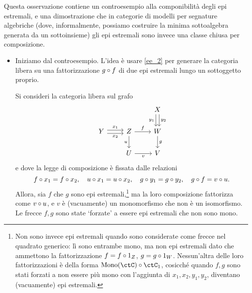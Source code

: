 \begin{remark}\label{compo_estremali}
	Questa osservazione contiene un controesempio alla componibilità degli epi estremali, e una dimostrazione che in categorie di modelli per segnature algebriche (dove, informalmente, possiamo costruire la minima sottoalgebra generata da un sottoinsieme) gli epi estremali sono invece una classe chiusa per composizione.
	\begin{itemize}
		\item Iniziamo dal controesempio. L'idea è usare \ref{ee_2} per generare la categoria libera su una fattorizzazione \(g\circ f\) di due epi estremali lungo un sottoggetto proprio.

		      Si consideri la categoria libera sul grafo
		      \[\begin{tikzcd}
				      && X \\
				      Y & Z & W \\
				      & U & V
				      \arrow["{y_2}", shift left=1, from=1-3, to=2-3]
				      \arrow["{y_1}"', shift right=1, from=1-3, to=2-3]
				      \arrow["{x_2}"', shift right=1, from=2-1, to=2-2]
				      \arrow["{x_1}", shift left=1, from=2-1, to=2-2]
				      \arrow["f", from=2-2, to=2-3]
				      \arrow["u"', from=2-2, to=3-2]
				      \arrow["g", from=2-3, to=3-3]
				      \arrow["v"', from=3-2, to=3-3]
			      \end{tikzcd}\]
		      e dove la legge di composizione è fissata dalle relazioni
		      \[f \circ x_1 = f \circ x_2, \quad u \circ x_1 = u \circ x_2, \quad g \circ y_1 = g \circ y_2, \quad g \circ f = v \circ u.\]
		      Allora, sia \(f\) che \(g\) sono epi estremali,\footnote{Non sono invece epi estremali quando sono considerate come frecce nel quadrato generico: lì sono entrambe mono, ma non epi estremali dato che ammettono la fattorizzazione \(f = f\circ 1_Z\), \(g = g\circ 1_W\). Nessun'altra delle loro fattorizzazioni è della forma \(\Mono[\ctC]\cmp \ctC_1\), cosicché quando \(f,g\) sono stati forzati a non essere più mono con l'aggiunta di \(x_1,x_2,y_1,y_2\), diventano (vacuamente) epi estremali.} ma la loro composizione fattorizza come \(v\circ u\), e \(v\) è (vacuamente) un monomorfismo che non è un isomorfismo. Le frecce \(f,g\) sono state `forzate' a essere epi estremali che non sono mono.

\end{itemize}
\end{remark}
